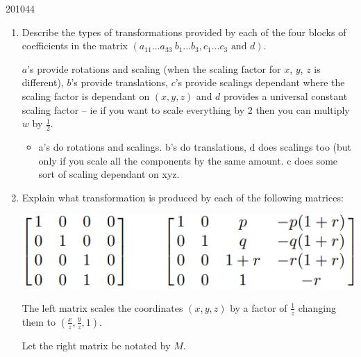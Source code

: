 \documentclass[10pt,\jkfside,a4paper]{article}
\begin{document}
\begin{enumerate}[label=(\alph*)]
\begin{examquestion}{2010}{4}{4}
\begin{enumerate}[label=(\alph*)]
\begin{enumerate}[label=(\roman*)]
\item Describe the types of transformations provided by each of the four blocks 
of coefficients in the matrix $(a_{11}\dots a_{33}\ b_{1}\dots b_{3}, c_1\dots c_3\text{ and } d)$.

$a$'s provide rotations and scaling (when the scaling factor for $x$, $y$, $z$ is different), $b$'s provide 
translations, $c$'s provide scalings dependant where the scaling factor is dependant on $(x,y,z)$ and $d$ provides 
a universal constant scaling factor -- ie if you want to scale everything by 2 then you can multiply $w$ by 
$\frac{1}{2}$.

\begin{itemize}
\item a's do rotations and scalings. b's do translations, d does scalings too (but only if you scale 
all the components by the same amount. c does some sort of scaling dependant on xyz.
\end{itemize}

\item Explain what transformation is produced by each of the following matrices:

\begin{center}
\includegraphics[scale=0.7]{matrixtransforms}
\end{center}

The left matrix scales the coordinates $(x, y, z)$ by a factor of $\frac{1}{z}$ changing them to 
$(\frac{x}{z}, \frac{y}{z}, 1)$.

Let the right matrix be notated by $M$.


\end{enumerate}
\end{enumerate}
\end{examquestion}
\end{enumerate}
\end{document}
